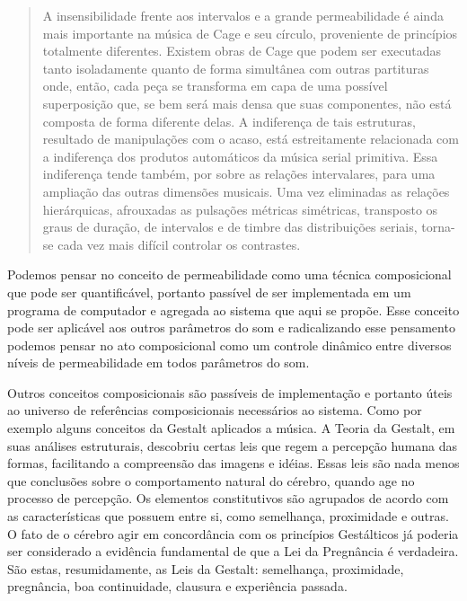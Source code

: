 \documentclass{ppgmus}
\begin{document}
\begin{quote}
  A insensibilidade frente aos intervalos e a grande permeabilidade é
  ainda mais importante na música de Cage e seu círculo, proveniente
  de princípios totalmente diferentes. Existem obras de Cage que podem
  ser executadas tanto isoladamente quanto de forma simultânea com
  outras partituras onde, então, cada peça se transforma em capa de
  uma possível superposição que, se bem será mais densa que suas
  componentes, não está composta de forma diferente delas. A
  indiferença de tais estruturas, resultado de manipulações com o
  acaso, está estreitamente relacionada com a indiferença dos produtos
  automáticos da música serial primitiva. Essa indiferença tende
  também, por sobre as relações intervalares, para uma ampliação das
  outras dimensões musicais. Uma vez eliminadas as relações
  hierárquicas, afrouxadas as pulsações métricas simétricas,
  transposto os graus de duração, de intervalos e de timbre das
  distribuições seriais, torna-se cada vez mais difícil controlar os
  contrastes.
\end{quote}

Podemos pensar no conceito de permeabilidade como uma técnica composicional
que pode ser quantificável, portanto passível de ser implementada em um programa
de computador e agregada ao sistema que aqui se propõe. Esse conceito pode ser
aplicável aos outros parâmetros do som e radicalizando esse pensamento podemos
pensar no ato composicional como um controle dinâmico entre diversos níveis de 
permeabilidade em todos parâmetros do som.


Outros conceitos composicionais são passíveis de implementação e portanto úteis 
ao universo de referências composicionais necessários ao sistema. Como por exemplo 
alguns conceitos da Gestalt aplicados a música. A Teoria da Gestalt, em suas análises estruturais, 
descobriu certas leis que regem a
percepção humana das formas, facilitando a compreensão das imagens e idéias. Essas leis são
nada menos que conclusões sobre o comportamento natural do cérebro, quando age no
processo de percepção. Os elementos constitutivos são agrupados de acordo com as
características que possuem entre si, como semelhança, proximidade e outras. O fato de o cérebro agir 
em concordância com os princípios Gestálticos já poderia ser
considerado a evidência fundamental de que a Lei da Pregnância é verdadeira. São estas,
resumidamente, as Leis da Gestalt: semelhança, proximidade, pregnância, boa continuidade, clausura e 
experiência passada.
\end{document}
